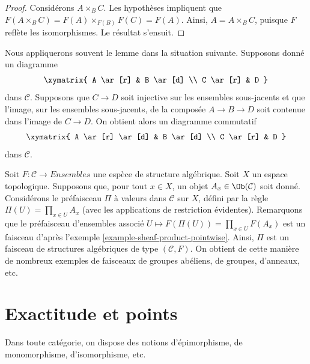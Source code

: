 \begin{proof}
Considérons $A \times_B C$. Les hypothèses impliquent que
$F(A \times_B C) = F(A) \times_{F(B)} F(C) = F(A)$.
Ainsi, $A = A \times_B C$, puisque $F$ reflète les isomorphismes.
Le résultat s'ensuit.
\end{proof}

\begin{example}
\label{example-application-lemma-image-contained-in}
Nous appliquerons souvent le lemme dans la situation suivante.
Supposons donné un diagramme
$$
\xymatrix{
A \ar[r] & B \ar[d] \\
C \ar[r] & D
}
$$
dans $\mathcal{C}$. Supposons que $C \to D$ soit injective sur les ensembles
sous-jacents et que l'image, sur les ensembles sous-jacents, de la composée
$A \to B \to D$ soit contenue dans l'image de $C \to D$.
On obtient alors un diagramme commutatif
$$
\xymatrix{
A \ar[r] \ar[d] & B \ar[d] \\
C \ar[r] & D
}
$$
dans $\mathcal{C}$.
\end{example}

\begin{example}
\label{example-sheaf-product-pointwise-algebraic-structure}
Soit $F : \mathcal{C} \to \textit{Ensembles}$ une espèce de structure algébrique.
Soit $X$ un espace topologique. Supposons que, pour tout $x \in X$, un objet
$A_x \in \Ob(\mathcal{C})$ soit donné. Considérons le préfaisceau $\Pi$ à
valeurs dans $\mathcal{C}$ sur $X$, défini par la règle
$\Pi(U) = \prod_{x \in U} A_x$ (avec les applications de restriction
évidentes). Remarquons que le préfaisceau d'ensembles associé
$U \mapsto F(\Pi(U)) = \prod_{x \in U} F(A_x)$ est un faisceau d'après
l'exemple \ref{example-sheaf-product-pointwise}.
Ainsi, $\Pi$ est un faisceau de structures algébriques de type
$(\mathcal{C} , F)$. On obtient de cette manière de nombreux exemples de
faisceaux de groupes abéliens, de groupes, d'anneaux, etc.
\end{example}












\section{Exactitude et points}
\label{section-exactness-points}

\noindent
Dans toute catégorie, on dispose des notions d'épimorphisme, de
monomorphisme, d'isomorphisme, etc.

